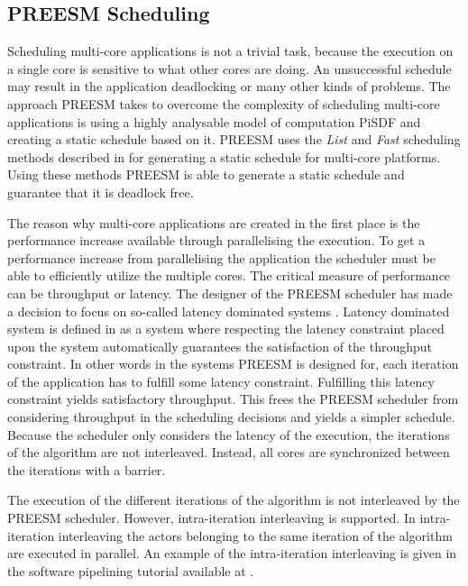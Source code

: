 \subsection{PREESM Scheduling}
\label{sec:preesm-scheduling}
Scheduling multi-core applications is not a trivial task, because the execution on a single core is sensitive to what other cores are doing. An unsuccessful schedule may result in the application deadlocking or many other kinds of problems. The approach PREESM takes to overcome the complexity of scheduling multi-core applications is using a highly analysable model of computation PiSDF and creating a static schedule based on it. PREESM uses the \textit{List} and \textit{Fast} scheduling methods described in \cite{kwok1997high} for generating a static schedule for multi-core platforms. Using these methods PREESM is able to generate a static schedule and guarantee that it is deadlock free.

The reason why multi-core applications are created in the first place is the performance increase available through parallelising the execution. To get a performance increase from parallelising the application the scheduler must be able to efficiently utilize the multiple cores. The critical measure of performance can be throughput or latency. The designer of the PREESM scheduler has made a decision to focus on so-called latency dominated systems \cite{pelcat2014preesm}. Latency dominated system is defined in \cite{ghamarian2006throughput} as a system where respecting the latency constraint placed upon the system automatically guarantees the satisfaction of the throughput constraint. In other words in the systems PREESM is designed for, each iteration of the application has to fulfill some latency constraint. Fulfilling this latency constraint yields satisfactory throughput. This frees the PREESM scheduler from considering throughput in the scheduling decisions and yields a simpler schedule. Because the scheduler only considers the latency of the execution, the iterations of the algorithm are not interleaved. Instead, all cores are synchronized between the iterations with a barrier.~\cite{pelcat2014preesm}

The execution of the different iterations of the algorithm is not interleaved by the PREESM scheduler. However, intra-iteration interleaving is supported. In intra-iteration interleaving the actors belonging to the same iteration of the algorithm are executed in parallel. \cite{pelcat2014preesm} An example of the intra-iteration interleaving is given in the software pipelining tutorial available at \cite{preesm}.

